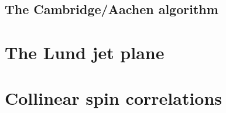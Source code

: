 \subsection{The Cambridge/Aachen algorithm}
\label{sec:ca}

\section{The Lund jet plane}
\label{sec:lund}

\section{Collinear spin correlations}
\label{sec:spin}
